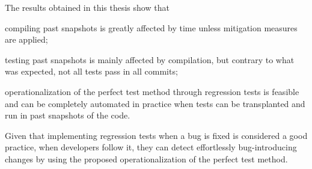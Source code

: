 The results obtained in this thesis show that 
\begin{inparaenum}[a)]
    \item compiling past snapshots is greatly affected by time unless mitigation measures are applied;
    \item testing past snapshots is mainly affected by compilation, but contrary to what was expected, not all tests pass in all commits;
    \item operationalization of the perfect test method through regression tests is feasible and can be completely automated in practice when tests can be transplanted and run in past snapshots of the code.
\end{inparaenum}
Given that implementing regression tests when a bug is fixed is considered a good practice, when developers follow it, they can detect effortlessly bug-introducing changes by using the proposed operationalization of the perfect test method.



